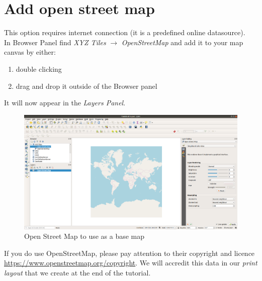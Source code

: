 
\section{Add open street map}

This option requires internet connection (it is a predefined online datasource).\\

In Browser Panel find \textit{XYZ Tiles} $\rightarrow$ \textit{OpenStreetMap} and add it to your map canvas by either:
\begin{enumerate}
	\item double clicking
	\item drag and drop it outside of the Browser panel
\end{enumerate}

It will now appear in the \textit{Layers Panel}.\\

\begin{figure}[!h]
	\centering
	\includegraphics[width=1\textwidth]{images/openstreetmap_EPSG3857.png}
	\caption{Open Street Map to use as a base map}
	\label{ft_fig_firstfig3}
\end{figure}


If you do use OpenStreetMap, please pay attention to their copyright and licence
\url{https://www.openstreetmap.org/copyright}. We will accredit this data in our \textit{print layout} that we create at the end of the tutorial.